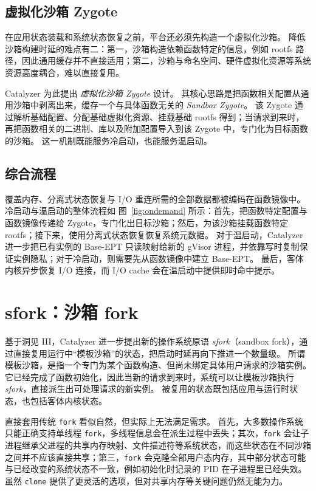 \documentclass[letterpaper,twocolumn,10pt]{article}
\newcommand{\sys}{Catalyzer}
\newcommand{\figref}[1]{图~\ref{#1}}
\begin{document}
\subsection{虚拟化沙箱 Zygote}\label{sec:zygote}
在应用状态装载和系统状态恢复之前，平台还必须先构造一个虚拟化沙箱。
降低沙箱构建时延的难点有二：第一，沙箱构造依赖函数特定的信息，例如 rootfs 路径，因此通用缓存并不直接适用；第二，沙箱与命名空间、硬件虚拟化资源等系统资源高度耦合，难以直接复用。

\sys{} 为此提出 \emph{虚拟化沙箱 Zygote} 设计。
其核心思路是把函数相关配置从通用沙箱中剥离出来，缓存一个与具体函数无关的 \emph{Sandbox Zygote}。
该 Zygote 通过解析基础配置、分配基础虚拟化资源、挂载基础 rootfs 得到；当请求到来时，再把函数相关的二进制、库以及附加配置导入到该 Zygote 中，专门化为目标函数的沙箱。
这一机制既能服务冷启动，也能服务温启动。

\subsection{综合流程}\label{sec:all-together}
覆盖内存、分离式状态恢复与 I/O 重连所需的全部数据都被编码在函数镜像中。
冷启动与温启动的整体流程如 \figref{fig:ondemand} 所示：首先，把函数特定配置与函数镜像传递给 Zygote，专门化出目标沙箱；然后，为该沙箱挂载函数特定 rootfs；接下来，使用分离式状态恢复恢复系统元数据。
对于温启动，\sys{} 进一步把已有实例的 Base-EPT 只读映射给新的 gVisor 进程，并依靠写时复制保证实例隐私；对于冷启动，则需要先从函数镜像中建立 Base-EPT。
最后，客体内核异步恢复 I/O 连接，而 I/O cache 会在温启动中提供即时命中提示。

\section{sfork：沙箱 fork}\label{sec:sfork}
基于洞见 III，\sys{} 进一步提出新的操作系统原语 \emph{sfork}（sandbox fork），通过直接复用运行中“模板沙箱”的状态，把启动时延再向下推进一个数量级。
所谓模板沙箱，是指一个专门为某个函数构造、但尚未绑定具体用户请求的沙箱实例。
它已经完成了函数初始化，因此当新的请求到来时，系统可以让模板沙箱执行 \emph{sfork}，直接派生出可处理请求的新实例。
被复用的状态既包括应用与运行时状态，也包括客体内核状态。

直接套用传统 \texttt{fork} 看似自然，但实际上无法满足需求。
首先，大多数操作系统只能正确支持单线程 \texttt{fork}，多线程信息会在派生过程中丢失；其次，\texttt{fork} 会让子进程继承父进程的共享内存映射、文件描述符等系统状态，而这些状态在不同沙箱之间并不应该直接共享；第三，\texttt{fork} 会克隆全部用户态内存，其中部分状态可能与已经改变的系统状态不一致，例如初始化时记录的 PID 在子进程里已经失效。
虽然 \texttt{clone} 提供了更灵活的选项，但对共享内存等关键问题仍然无能为力。
\end{document}
